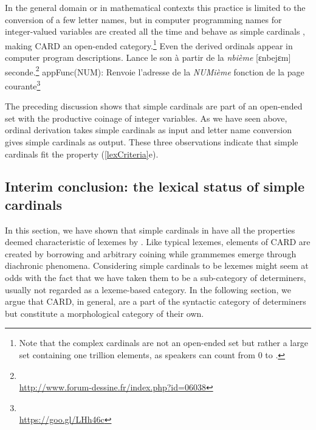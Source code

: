\documentclass[output=paper]{langsci/langscibook}
\begin{document}
In the general domain or in mathematical contexts this practice is limited to the conversion of a few letter names, but in computer programming names for integer-valued variables are created all the time and behave as simple cardinals , making CARD an open-ended category.\footnote{Note that the  complex cardinals  are not an open-ended set but rather a large set containing one trillion elements, as  speakers can count from 0 to .} Even the derived ordinals appear in computer program descriptions.
\ea\label{progCardinals}
	\ea Lance le son à partir de la \emph{nbième} [ɛnbejɛm] seconde.\footnote{\\\url{http://www.forum-dessine.fr/index.php?id=06038}}
	\ex appFunc(NUM):	Renvoie l'adresse de la \emph{NUMième} fonction de la page courante\footnote{\\\url{https://goo.gl/LHh46c}}
	\z
\z

The preceding discussion shows that  simple cardinals  are part of an open-ended set with the productive coinage of integer variables. As we have seen above, ordinal derivation takes simple cardinals  as input and letter name conversion gives simple cardinals  as output. These three observations indicate that  simple cardinals  fit the property (\ref{lexCriteria}e).

\subsection{\textbf{Interim conclusion: the lexical status of simple cardinals}}

In this section, we have shown that simple cardinals  in  have all the properties deemed characteristic of lexemes by \citet{Fradin03}. Like typical lexemes, elements of CARD are created by borrowing and arbitrary coining while grammemes emerge through diachronic phenomena.
Considering simple cardinals  to be lexemes might seem at odds with the fact that we have taken them to be a sub-category of determiners, usually not regarded as a lexeme-based category. In the following section, we argue that CARD, in general, are a part of the syntactic category of determiners but constitute a morphological %
category of their own.
\bigskip
\end{document}
